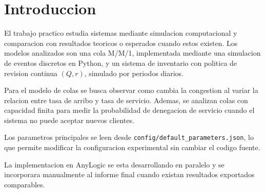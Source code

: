 \section{Introduccion}

El trabajo practico estudia sistemas mediante simulacion computacional y comparacion con resultados teoricos o esperados cuando estos existen. Los modelos analizados son una cola M/M/1, implementada mediante una simulacion de eventos discretos en Python, y un sistema de inventario con politica de revision continua $(Q,r)$, simulado por periodos diarios.

Para el modelo de colas se busca observar como cambia la congestion al variar la relacion entre tasa de arribo y tasa de servicio. Ademas, se analizan colas con capacidad finita para medir la probabilidad de denegacion de servicio cuando el sistema no puede aceptar nuevos clientes.

Los parametros principales se leen desde \texttt{config/default\_parameters.json}, lo que permite modificar la configuracion experimental sin cambiar el codigo fuente.

La implementacion en AnyLogic se esta desarrollando en paralelo y se incorporara manualmente al informe final cuando existan resultados exportados comparables.
